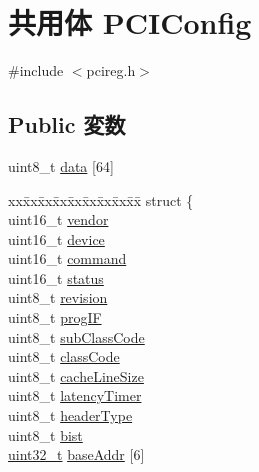 \hypertarget{unionPCIConfig}{
\section{共用体 PCIConfig}
\label{unionPCIConfig}
}


{\ttfamily \#include $<$pcireg.h$>$}\subsection*{Public 変数}
\begin{DoxyCompactItemize}
\item 
uint8\_\-t \hyperlink{unionPCIConfig_a6fcedd1c789a695a3a181a7a6624d368}{data} \mbox{[}64\mbox{]}
\item 
\begin{tabbing}
xx\=xx\=xx\=xx\=xx\=xx\=xx\=xx\=xx\=\kill
struct \{\\
\>uint16\_t \hyperlink{unionPCIConfig_a593296dde780579566307c0f86863463}{vendor}\\
\>uint16\_t \hyperlink{unionPCIConfig_a7067c32aa9abbb1c4ccd48e2ae816b25}{device}\\
\>uint16\_t \hyperlink{unionPCIConfig_a4635796d5c7e7a2639b11dfe83718acc}{command}\\
\>uint16\_t \hyperlink{unionPCIConfig_a5393c99e246925076b1dfd69a64177ef}{status}\\
\>uint8\_t \hyperlink{unionPCIConfig_ab01c6e281b316b1770d5646f3d3101c4}{revision}\\
\>uint8\_t \hyperlink{unionPCIConfig_ac82e6aca754538cf773d8f568de3f531}{progIF}\\
\>uint8\_t \hyperlink{unionPCIConfig_a22931b94a795e5dab2d455b002ebf53a}{subClassCode}\\
\>uint8\_t \hyperlink{unionPCIConfig_af84e31a983835c0c8af26af863eef593}{classCode}\\
\>uint8\_t \hyperlink{unionPCIConfig_a40faafdd058d83dcb37bfd67ddc73898}{cacheLineSize}\\
\>uint8\_t \hyperlink{unionPCIConfig_a5b4fde1bb017d50e4570b7c8b2c467cb}{latencyTimer}\\
\>uint8\_t \hyperlink{unionPCIConfig_adefc8e4ce5d493a1e9768c4d97b12a3f}{headerType}\\
\>uint8\_t \hyperlink{unionPCIConfig_a8d48dac06bef0723bce81846b48d9c63}{bist}\\
\>\hyperlink{Type_8hh_a435d1572bf3f880d55459d9805097f62}{uint32\_t} \hyperlink{unionPCIConfig_a7c299fe89c28505d06cdabe7909ff075}{baseAddr} \mbox{[}6\mbox{]}\\

\end{tabbing}
\end{DoxyCompactItemize}

